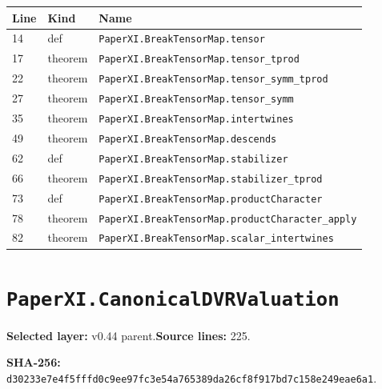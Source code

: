 \documentclass[10pt,oneside]{book}
\begin{document}
\begin{longtable}{@{}p{}p{}p{}@{}}\toprule Line&Kind&Name\\\midrule\endhead

14&def&\nolinkurl{PaperXI.BreakTensorMap.tensor}\\

17&theorem&\nolinkurl{PaperXI.BreakTensorMap.tensor_tprod}\\

22&theorem&\nolinkurl{PaperXI.BreakTensorMap.tensor_symm_tprod}\\

27&theorem&\nolinkurl{PaperXI.BreakTensorMap.tensor_symm}\\

35&theorem&\nolinkurl{PaperXI.BreakTensorMap.intertwines}\\

49&theorem&\nolinkurl{PaperXI.BreakTensorMap.descends}\\

62&def&\nolinkurl{PaperXI.BreakTensorMap.stabilizer}\\

66&theorem&\nolinkurl{PaperXI.BreakTensorMap.stabilizer_tprod}\\

73&def&\nolinkurl{PaperXI.BreakTensorMap.productCharacter}\\

78&theorem&\nolinkurl{PaperXI.BreakTensorMap.productCharacter_apply}\\

82&theorem&\nolinkurl{PaperXI.BreakTensorMap.scalar_intertwines}\\

\bottomrule\end{longtable}

\section{\texorpdfstring{\nolinkurl{PaperXI.CanonicalDVRValuation}}{PaperXI.CanonicalDVRValuation}}\label{module:PaperXI.CanonicalDVRValuation}

\textbf{Selected layer:} v0.44 parent.\quad\textbf{Source lines:} 225.\par\textbf{SHA-256:} {\scriptsize\nolinkurl{d30233e7e4f5fffd0c9ee97fc3e54a765389da26cf8f917bd7c158e249eae6a1}}.

\end{document}
